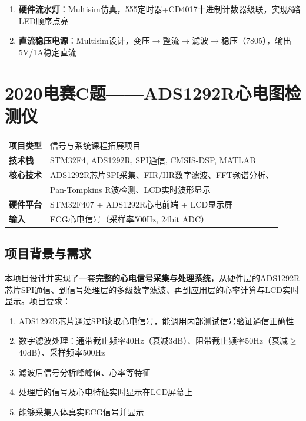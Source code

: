 \documentclass[12pt,a4paper]{ctexart}
\begin{document}
\begin{enumerate}
    \item \textbf{硬件流水灯}：Multisim仿真，555定时器+CD4017十进制计数器级联，实现8路LED顺序点亮
    \item \textbf{直流稳压电源}：Multisim设计，变压$\to$整流$\to$滤波$\to$稳压（7805），输出5V/1A稳定直流
\end{enumerate}

\newpage
\section{2020电赛C题——ADS1292R心电图检测仪}

\begin{infobox}[项目概况]
\begin{tabular}{ll}
\textbf{项目类型} & 信号与系统课程拓展项目 \\
\textbf{技术栈}   & STM32F4, ADS1292R, SPI通信, CMSIS-DSP, MATLAB \\
\textbf{核心技术} & ADS1292R芯片SPI采集、FIR/IIR数字滤波、FFT频谱分析、\\
                  & Pan-Tompkins R波检测、LCD实时波形显示 \\
\textbf{硬件平台} & STM32F407 + ADS1292R心电前端 + LCD显示屏 \\
\textbf{输入}     & ECG心电信号（采样率500Hz, 24bit ADC）
\end{tabular}
\end{infobox}

\subsection{项目背景与需求}

本项目设计并实现了一套\textbf{完整的心电信号采集与处理系统}，从硬件层的ADS1292R芯片SPI通信、到信号处理层的多级数字滤波、再到应用层的心率计算与LCD实时显示。项目要求：

\begin{enumerate}
    \item ADS1292R芯片通过SPI读取心电信号，能调用内部测试信号验证通信正确性
    \item 数字滤波处理：通带截止频率40Hz（衰减3dB）、阻带截止频率50Hz（衰减$\geq$40dB）、采样频率500Hz
    \item 滤波后信号分析峰峰值、心率等特征
    \item 处理后的信号及心电特征实时显示在LCD屏幕上
    \item 能够采集人体真实ECG信号并显示
\end{enumerate}
\end{document}
